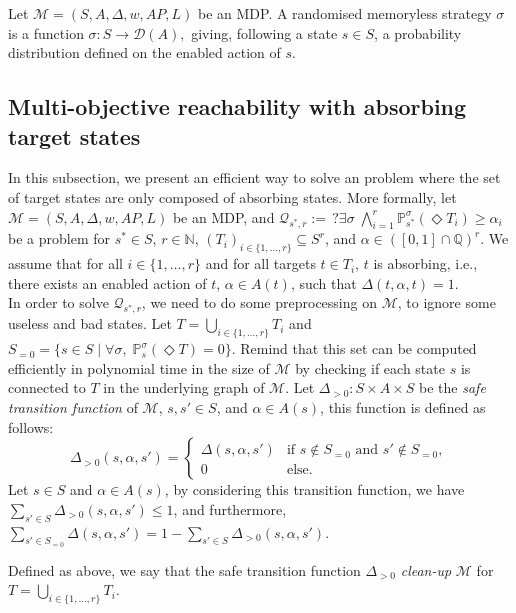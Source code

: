 \begin{definition}
  Let \sloppy$\mathcal{M}=(S, A, \Delta, w, AP, L)$ be an MDP. A randomised memoryless strategy $\sigma$ is a function
  $
    \sigma: S \rightarrow \mathcal{D}(A),
  $ giving, following a state $s \in S$, a probability distribution defined on the enabled action of $s$.
\end{definition}

\subsection{Multi-objective reachability with absorbing target \sloppy states} \label{MOSR-absorbing}

In this subsection, we present an efficient way to solve an \MOSR{} problem where the set of target states are only composed of absorbing states. More formally, let $\mathcal{M}=(S, A, \Delta, w, AP, L)$ be an MDP, and
$
  \mathcal{Q}_{s^*, r} := \,?\exists \sigma\; \bigwedge_{i=1}^r \mathbb{P}^\sigma_{s^*}(\Diamond T_i) \geq \alpha_i
$
be a \MOSR{} problem for $s^* \in S$, $r \in \mathbb{N}$, $(T_i)_{i \in \{1, \dots, r\}} \subseteq S^r$, and $\alpha \in ([0, 1] \cap \mathbb{Q})^r$.
We assume that for all $i \in \{ 1, \dots, r\}$ and for all targets $t \in T_i$, $t$ is absorbing, i.e., there exists an enabled action of $t$, $\alpha \in A(t)$, such that $\Delta(t, \alpha, t) = 1$.\\

In order to solve $\mathcal{Q}_{s^*, r}$, we need to do some preprocessing on $\mathcal{M}$, to ignore some useless and bad states.
Let $T = \bigcup_{i \in \{1, \dots, r\}} T_i$ and $S_{=0} = \{s \in S \; | \; \forall \sigma, \; \mathbb{P}_{s}^\sigma(\Diamond T) = 0\}$.
  Remind that this set can be computed efficiently in polynomial time in the size of $\mathcal{M}$ by checking if each state $s$ is connected to $T$ in the underlying graph of $\mathcal{M}$.
Let $\Delta_{>0} : S \times A \times S$ be the \textit{safe transition function} of $\mathcal{M}$, $s, s' \in S$, and $\alpha \in A(s)$, this function is defined as follows:
  \[
    \Delta_{>0}(s, \alpha, s') = \begin{cases}
      \Delta(s, \alpha, s') &\text{if } s \not \in S_{=0} \text{ and } s' \not\in S_{=0}, \\
      0 &\text{else}.
    \end{cases}
  \]
  Let $s \in S$ and $\alpha \in A(s)$,
  by considering this transition function, we have \sloppy$\sum_{s' \in S} \Delta_{>0}(s, \alpha, s') \leq 1$, and furthermore,
      $\sum_{s' \in S_{=0}} \Delta(s, \alpha, s') =
      1 - \sum_{s' \in S} \Delta_{>0}(s, \alpha, s') $.
\begin{notation}
  Defined as above, we say that the safe transition function $\Delta_{>0}$ \textit{clean-up} $\mathcal{M}$ for $T = \bigcup_{i \in \{1, \dots, r\}} T_i$.
\end{notation}

